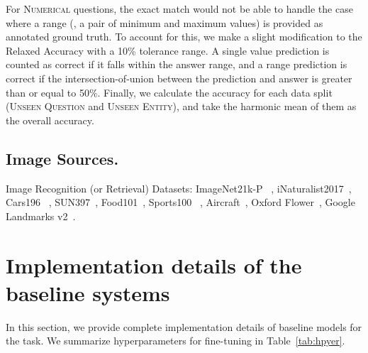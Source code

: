 \documentclass[11pt]{article}
\begin{document}
For \textsc{Numerical} questions, the exact match would not be able to handle the case where a range (\eg, a pair of minimum and maximum values) is provided as annotated ground truth. To account for this, we make a slight modification to the Relaxed Accuracy with a 10\% tolerance range. 
\noindent{}
A single value prediction is counted as correct if it falls within the answer range, and a range prediction is correct if the intersection-of-union between the prediction and answer is greater than or equal to 50\%.
Finally, we calculate the accuracy for each data split (\textsc{Unseen Question} and \textsc{Unseen Entity}), and take the harmonic mean of them as the overall accuracy.



\subsection{Image Sources.}
Image Recognition (or Retrieval) Datasets: ImageNet21k-P ~\cite{russakovsky2015imagenet,ridnik2021imagenet}, iNaturalist2017~\cite{van2018inaturalist}, Cars196 ~\cite{krause20133d}, SUN397~\cite{xiao2010sun}, Food101~\cite{bossard2014food}, 
Sports100 ~\cite{sport100}, Aircraft~\cite{maji2013fine},
Oxford Flower~\cite{nilsback2008automated}, Google Landmarks v2~\cite{weyand2020google}.

\section{Implementation details of the baseline systems}
In this section, we provide complete implementation details of baseline models for the \ourdataset task. We summarize hyperparameters for fine-tuning in Table~\ref{tab:hpyer}.
\end{document}
